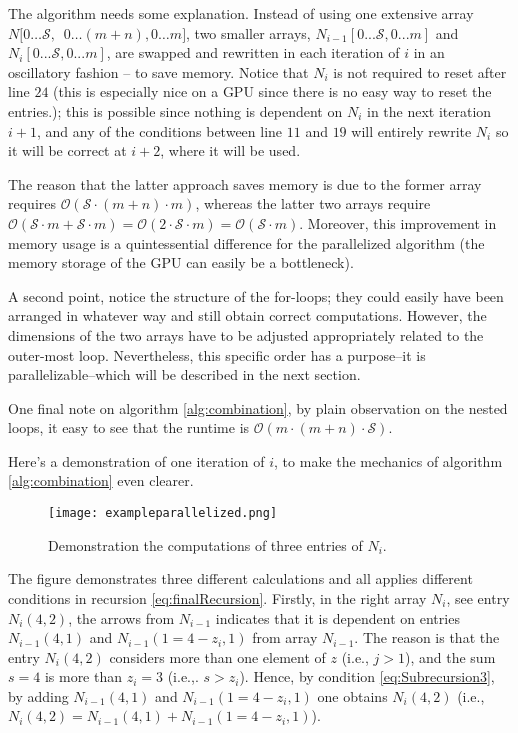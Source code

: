 \documentclass[a4paper,11pt]{article}
\begin{document}
The algorithm needs some explanation. Instead of using one extensive array $N[0\ldots \mathcal{S},$\ $0\ldots(m+n),0\ldots m]$, two smaller arrays, $N_{i-1}[0...\mathcal{S},0...m]$ and $N_{i}[0...\mathcal{S},0...m]$, are swapped and rewritten in each iteration of $i$ in an oscillatory fashion – to save memory. Notice that $N_{i}$ is not required to reset after line $24$ (this is especially nice on a GPU since there is no easy way to reset the entries.); this is possible since nothing is dependent on $N_{i}$ in the next iteration $i+1$, and any of the conditions between line $11$ and $19$ will entirely rewrite $N_{i}$ so it will be correct at $i+2$, where it will be used.

The reason that the latter approach saves memory is due to the former array requires $\mathcal{O}(\mathcal{S} \cdot (m+n) \cdot m)$, whereas the latter two arrays require $\mathcal{O}(\mathcal{S} \cdot m + \mathcal{S} \cdot m) = \mathcal{O}( 2 \cdot \mathcal{S} \cdot m)=\mathcal{O}(\mathcal{S} \cdot m)$. Moreover, this improvement in memory usage is a quintessential difference for the parallelized algorithm (the memory storage of the GPU can easily be a bottleneck).

A second point, notice the structure of the for-loops; they could easily have been arranged in whatever way and still obtain correct computations. However, the dimensions of the two arrays have to be adjusted appropriately related to the outer-most loop. Nevertheless, this specific order has a purpose–it is parallelizable–which will be described in the next section.

One final note on algorithm \ref{alg:combination}, by plain observation on the nested loops, it easy to see that the runtime is $\mathcal{O}(m\cdot (m+n)\cdot \mathcal{S})$.

Here's a demonstration of one iteration of $i$, to make the mechanics of algorithm \ref{alg:combination} even clearer.

\begin{figure}[H]
\centering
\texttt{[image: exampleparallelized.png]}
\caption{Demonstration the computations of three entries of $N_{i}$.}\label{normal_calibration.png}
\end{figure}

The figure demonstrates three different calculations and all applies different conditions in recursion \ref{eq:finalRecursion}. Firstly, in the right array $N_{i}$, see entry $N_{i}(4,2)$, the arrows from $N_{i-1}$ indicates that it is dependent on entries $N_{i-1}(4,1)$ and $N_{i-1}(1=4-z_{i},1)$ from array $N_{i-1}$. The reason is that the entry $N_{i}(4,2)$ considers more than one element of $z$ (i.e., $j>1$), and the sum $s=4$ is more than $z_{i}=3$ (i.e.,. $s>z_{i}$). Hence, by condition \ref{eq:Subrecursion3}, by adding $N_{i-1}(4,1)$ and $N_{i-1}(1=4-z_{i},1)$ one obtains $N_{i}(4,2)$ (i.e., $N_{i}(4,2)=N_{i-1}(4,1) +N_{i-1}(1=4-z_{i},1)$).
\end{document}
